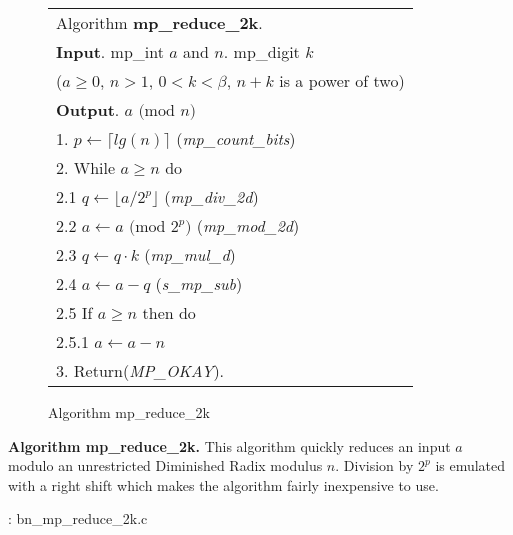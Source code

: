 \documentclass[b5paper]{book}
\begin{document}
\begin{figure}[!here]
\begin{small}
\begin{center}
\begin{tabular}{l}
\hline Algorithm \textbf{mp\_reduce\_2k}. \\
\textbf{Input}.   mp\_int $a$ and $n$.  mp\_digit $k$  \\
\hspace{11.5mm}($a \ge 0$, $n > 1$, $0 < k < \beta$, $n + k$ is a power of two) \\
\textbf{Output}.  $a \mbox{ (mod }n\mbox{)}$ \\
\hline
1.  $p \leftarrow \lceil lg(n) \rceil$  (\textit{mp\_count\_bits}) \\
2.  While $a \ge n$ do \\
\hspace{3mm}2.1  $q \leftarrow \lfloor a / 2^p \rfloor$ (\textit{mp\_div\_2d}) \\
\hspace{3mm}2.2  $a \leftarrow a \mbox{ (mod }2^p\mbox{)}$ (\textit{mp\_mod\_2d}) \\
\hspace{3mm}2.3  $q \leftarrow q \cdot k$ (\textit{mp\_mul\_d}) \\
\hspace{3mm}2.4  $a \leftarrow a - q$ (\textit{s\_mp\_sub}) \\
\hspace{3mm}2.5  If $a \ge n$ then do \\
\hspace{6mm}2.5.1  $a \leftarrow a - n$ \\
3.  Return(\textit{MP\_OKAY}). \\
\hline
\end{tabular}
\end{center}
\end{small}
\caption{Algorithm mp\_reduce\_2k}
\end{figure}

\textbf{Algorithm mp\_reduce\_2k.}
This algorithm quickly reduces an input $a$ modulo an unrestricted Diminished Radix modulus $n$.  Division by $2^p$ is emulated with a right
shift which makes the algorithm fairly inexpensive to use.  

\vspace{+3mm}\begin{small}
\hspace{-5.1mm}{\bf File}: bn\_mp\_reduce\_2k.c
\vspace{-3mm}
\begin{alltt}
\end{alltt}
\end{small}
\end{document}
